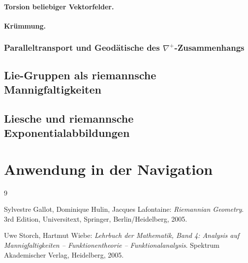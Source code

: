 \documentclass[10pt,a4paper]{article}
\theoremstyle{mytheorem}
\theoremstyle{mydefinition}
\begin{document}
\paragraph{Torsion beliebiger Vektorfelder.}

\paragraph{Krümmung.}

\subsubsection{Paralleltransport und Geodätische des $\nabla^+$-Zusammenhangs}

\subsection{Lie-Gruppen als riemannsche Mannigfaltigkeiten}

\subsection{Liesche und riemannsche Exponentialabbildungen}

\section{Anwendung in der Navigation}




\begin{thebibliography}{9}

Sylvestre Gallot, Dominique Hulin, Jacques Lafontaine:
\textit{Riemannian Geometry}.
3rd Edition, Universitext, Springer, Berlin/Heidelberg, 2005.

Uwe Storch, Hartmut Wiebe:
\textit{Lehrbuch der Mathematik, Band 4: Analysis auf Mannigfaltigkeiten -- Funktionentheorie -- Funktionalanalysis}.
Spektrum Akademischer Verlag, Heidelberg, 2005.

\end{thebibliography}
\end{document}
